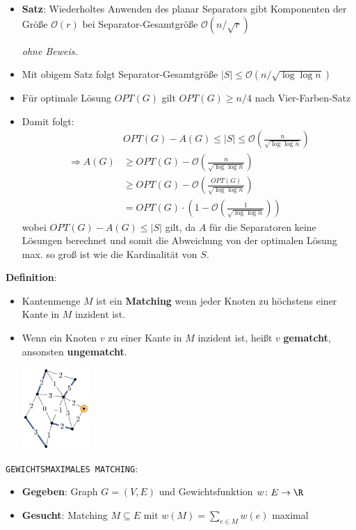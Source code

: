 \begin{itemize}
	\item \textbf{Satz}: Wiederholtes Anwenden des planar Separators gibt Komponenten der Größe $\mathcal{O}(r)$ bei Separator-Gesamtgröße $\mathcal{O}(n/\sqrt{r})$
	
	\textit{ohne Beweis.}
	
	\item Mit obigem Satz folgt Separator-Gesamtgröße $|S|\leq\mathcal{O}(n/\sqrt{\log\log n})$
	\item Für optimale Lösung $OPT(G)$ gilt $OPT(G)\geq n/4$ nach Vier-Farben-Satz
	\item Damit folgt:
	$$
	\begin{aligned}
		& OPT(G)-A(G) \leq|S| \leq \mathcal{O}\left(\frac{n}{\sqrt{\log \log n}}\right) \\
		\Rightarrow A(G) & \geq OPT(G)-\mathcal{O}\left(\frac{n}{\sqrt{\log \log n}}\right) \\
		& \geq OPT(G)-\mathcal{O}\left(\frac{OPT(G)}{\sqrt{\log \log n}}\right) \\
		& =OPT(G) \cdot\left(1-\mathcal{O}\left(\frac{1}{\sqrt{\log \log n}}\right)\right)
	\end{aligned}
	$$
	wobei $OPT(G)-A(G) \leq|S|$ gilt, da $A$ für die Separatoren keine Lösungen berechnet und somit die Abweichung von der optimalen Lösung max. so groß ist wie die Kardinalität von $S$.
\end{itemize}
\bigskip
\textbf{Definition}:
\begin{itemize}
	\item Kantenmenge $M$ ist ein \textbf{Matching} wenn jeder Knoten zu höchstens einer Kante in $M$ inzident ist.
	\item Wenn ein Knoten $v$ zu einer Kante in $M$ inzident ist, heißt $v$ \textbf{gematcht}, ansonsten \textbf{ungematcht}.
	\begin{center}
		\includegraphics[width=0.2\textwidth]{images/matching.png}
	\end{center}
\end{itemize}
\bigskip
\texttt{GEWICHTSMAXIMALES MATCHING}: 
\begin{itemize}
	\item \textbf{Gegeben}: Graph $G=(V,E)$ und Gewichtsfunktion $w\colon E\rightarrow\R$
	\item \textbf{Gesucht}: Matching $M\subseteq E$ mit $w(M)=\sum\limits_{e\in M} w(e)$ maximal
\end{itemize}
